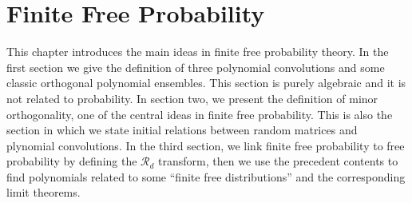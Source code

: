 \chapter{Finite Free Probability} \label{ch:finite_free}

This chapter introduces the main ideas in finite free probability theory. In the first section we give the definition of three polynomial convolutions and some classic orthogonal polynomial ensembles. This section is purely algebraic and it is not related to probability. In section two, we present the definition of minor orthogonality, one of the central ideas in finite free probability. This is also the section in which we state initial relations between random matrices and plynomial convolutions. In the third section, we link finite free probability to free probability by defining the $\mathcal R_d$ transform, then we use the precedent contents to find polynomials related to some ``finite free distributions'' and the corresponding limit theorems.



